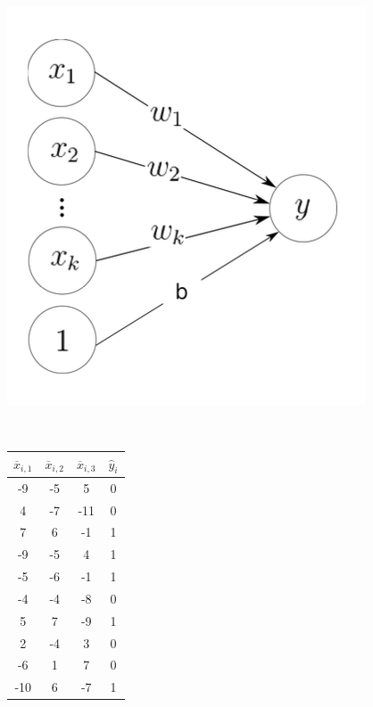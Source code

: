 \documentclass[a4paper,12pt]{article} %
\begin{document}
	\begin{figure}[H]
		\begin{minipage}[c]{.49\textwidth}
			\centering
			\includegraphics[width=.7\linewidth]{neuron.png}
			\label{fig:perceptron}
		\end{minipage}
		~
		\begin{minipage}[c]{.49\textwidth}
			\centering
			\begin{tabular}{|c|c|c|c|}
				\hline
				$\overline{x}_{i,1}$ & $\overline{x}_{i,2}$ & 
				$\overline{x}_{i,3}$ & $\hat{y}_i$ \\\hline
				-9         & -5         & 5          & 
				0                           \\\hline
				4          & -7         & -11        & 
				0                           \\\hline
				7          & 6          & -1         & 
				1                           \\\hline
				-9         & -5         & 4          & 
				1                           \\\hline
				-5         & -6         & -1         & 
				1                           \\\hline
				-4         & -4         & -8         & 
				0                           \\\hline
				5          & 7          & -9         & 
				1                           \\\hline
				2          & -4         & 3          & 
				0                           \\\hline
				-6         & 1          & 7          & 
				0                           \\\hline
				-10        & 6          & -7         & 
				1                           \\\hline
			\end{tabular}
			\label{tab:train-dataset}
		\end{minipage}
	\end{figure}
	\vspace{0.4cm}
	
\end{document}
